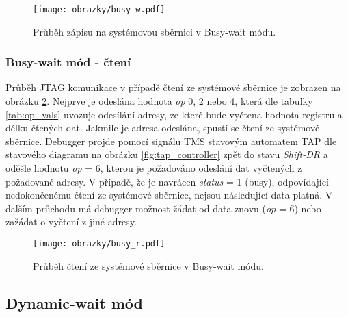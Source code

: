 \begin{figure}[!h]
  \begin{center}
    \texttt{[image: obrazky/busy\_w.pdf]}
  \end{center}
  \caption{Průběh zápisu na systémovou sběrnici v Busy-wait módu.}
	\label{fig:busy_w}
\end{figure}

\subsubsection{Busy-wait mód - čtení} 
Průběh JTAG komunikace v případě čtení ze systémové sběrnice je zobrazen na obrázku \ref{fig:busy_r}. Nejprve je odeslána hodnota \textit{op} 0, 2 nebo 4, která dle tabulky \ref{tab:op_vals} uvozuje odesílání adresy, ze které bude vyčtena hodnota registru a délku čtených dat. Jakmile je adresa odeslána, spustí se čtení ze systémové sběrnice. Debugger projde pomocí signálu \acs{TMS} stavovým automatem \acs{TAP} dle stavového diagramu na obrázku \ref{fig:tap_controller} zpět do stavu \textit{Shift-DR} a oděšle hodnotu \textit{op} = 6, kterou je požadováno odeslání dat vyčtených z požadované adresy. V případě, že je navrácen \textit{status} = 1 (busy), odpovídající nedokončenému čtení ze systémové sběrnice, nejsou následující data platná. V dalším průchodu má debugger možnost žádat od data znovu (\textit{op} = 6) nebo zažádat o vyčtení z jiné adresy.

\begin{figure}[!h]
  \begin{center}
    \texttt{[image: obrazky/busy\_r.pdf]}
  \end{center}
  \caption{Průběh čtení ze systémové sběrnice v Busy-wait módu.}
	\label{fig:busy_r}
\end{figure}

\subsection{Dynamic-wait mód}	\label{subsec:dyn-wait}
